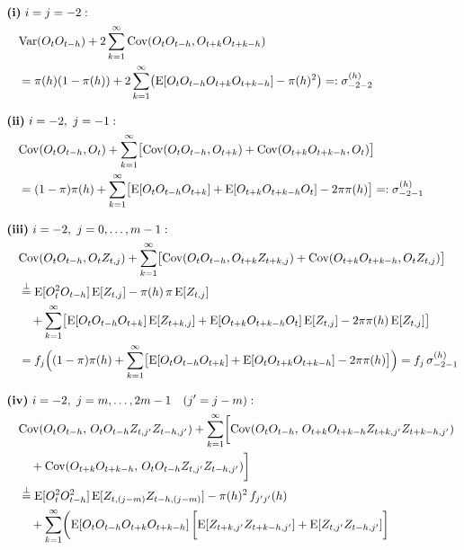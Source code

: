 ﻿\documentclass[12pt,a4paper]{scrreprt}
\theoremstyle{definition}
\begin{document}
{\allowdisplaybreaks
\begin{align*} 
&\textbf{(i)}\ i = j = -2: \\
&\quad \mathrm{Var}(O_t O_{t-h}) 
+ 2\sum_{k=1}^\infty \mathrm{Cov}(O_tO_{t-h}, O_{t+k}O_{t+k-h}) \\
&\quad = \pi(h)(1-\pi(h)) 
+ 2\sum_{k=1}^{\infty}\bigl(
\mathrm{E}[O_tO_{t-h}O_{t+k}O_{t+k-h}] - \pi(h)^2\bigr) =: \sigma^{(h)}_{-2-2} \\[2ex]
%
&\textbf{(ii)}\ i = -2,\ j = -1: \\
&\quad \mathrm{Cov}(O_tO_{t-h}, O_t) 
+ \sum_{k=1}^\infty\bigl[
\mathrm{Cov}(O_tO_{t-h}, O_{t+k})
+ \mathrm{Cov}(O_{t+k}O_{t+k-h}, O_t)\bigr] \\
&\quad = (1-\pi)\pi(h) 
+ \sum_{k=1}^{\infty}\bigl[
\mathrm{E}[O_tO_{t-h}O_{t+k}] 
+ \mathrm{E}[O_{t+k}O_{t+k-h}O_t] - 2\pi\pi(h)\bigr]
=: \sigma^{(h)}_{-2-1}\\[2ex]
%
&\textbf{(iii)}\ i = -2,\ j = 0, \ldots, m-1: \\
&\quad \mathrm{Cov}(O_tO_{t-h}, O_tZ_{t,j}) 
+ \sum_{k=1}^{\infty}\bigl[
\mathrm{Cov}(O_tO_{t-h}, O_{t+k}Z_{t+k,j}) 
+ \mathrm{Cov}(O_{t+k}O_{t+k-h}, O_tZ_{t,j})\bigr] \\
&\quad \overset{\perp}{=} 
\mathrm{E}[O_t^2O_{t-h}]\,\mathrm{E}[Z_{t,j}] 
- \pi(h)\,\pi\,\mathrm{E}[Z_{t,j}]\\
&\qquad + \sum_{k=1}^{\infty}\bigl[
\mathrm{E}[O_tO_{t-h}O_{t+k}]\,\mathrm{E}[Z_{t+k,j}] 
+ \mathrm{E}[O_{t+k}O_{t+k-h}O_t]\,\mathrm{E}[Z_{t,j}] 
- 2\pi\pi(h)\,\mathrm{E}[Z_{t,j}]\bigr]\\
&\quad = f_j\Bigl((1-\pi)\pi(h) 
+ \sum_{k=1}^{\infty}\bigl[
\mathrm{E}[O_tO_{t-h}O_{t+k}]
+ \mathrm{E}[O_tO_{t+k}O_{t+k-h}] - 2\pi\pi(h)\bigr]\Bigr)
= f_j\,\sigma^{(h)}_{-2-1}\\[2ex]
%
&\textbf{(iv)}\ i = -2,\ j = m, \ldots, 2m-1 \quad (j'=j-m):\\ 
&\quad \mathrm{Cov}(O_tO_{t-h},\, O_tO_{t-h}Z_{t,j'}Z_{t-h,j'}) + \sum_{k=1}^{\infty}\biggl[
\mathrm{Cov}(O_tO_{t-h},\, O_{t+k}O_{t+k-h}Z_{t+k, j'}Z_{t+k-h,j'}) \\
 &\qquad + \mathrm{Cov}(O_{t+k}O_{t+k-h},\, 
O_t O_{t-h}Z_{t,j'}Z_{t-h,j'})\biggr] \\
&\quad \overset{\perp}{=} 
\mathrm{E}[O_t^2O_{t-h}^2]\,\mathrm{E}[Z_{t,(j-m)}Z_{t-h,(j-m)}] 
- \pi(h)^2\,f_{j'j'}(h)\\
&\qquad + \sum_{k=1}^{\infty} \biggl(
\mathrm{E}[O_tO_{t-h}O_{t+k}O_{t+k-h}]\,\biggl[
\mathrm{E}[Z_{t+k, j'}Z_{t+k-h, j'}]
+ \mathrm{E}[Z_{t,j'}Z_{t-h, j'}]\biggr]

\end{align*}}
\end{document}
